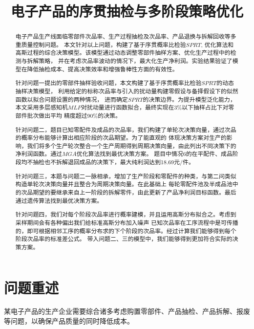 \documentclass[withoutpreface,bwprint]{cumcmthesis} %
\title{电子产品的序贯抽检与多阶段策略优化}
\begin{document}
\maketitle
\begin{abstract}
	电子产品生产线面临零部件次品率、生产过程抽检及次品率、产品退换与拆解回收等多重质量控制问题。
	本文针对以上问题，构建了基于序贯概率比检验$SPRT$,
	优化算法和高斯过程的综合决策模型。该模型通过动态调整零部件抽样方案、优化生产过程中的检测与拆解策略，
	并在考虑次品率波动的情况下，最大化生产净利润。实验结果验证了模型在降低抽检成本、提高决策效率和增强鲁棒性方面的有效性。

	针对问题一提出的零部件抽样验收问题，本文构建了基于序贯概率比检验$SPRT$的动态抽样决策模型，
	利用给定的标称次品率与引入的扰动量构建零假设与备择假设下的似然函数以拟合问题设置的两种情况，
	进而确定$SPRT$的决策边界。为提升模型泛化能力，本文采用多层感知机$MLP$对扰动量进行函数拟合，最终实现在3\%以下抽样占比下对零部件批次做出平均
	精度超过90\%的决策。

	针对问题二，题目已知零配件及成品的次品率，我们构建了单轮次决策向量，通过次品的概率分布能够计算出相应阶段的次品期望。为了能直观的
	体现决策方案对生产的影响，我们将多个生产轮次整合一个生产周期得到周期决策向量，由此列出不同决策下的净利润函数。通过$MGA$优化算法找到最优决策方案。
	题目中情况6的在平配件、成品阶段均不抽检也不拆解退回成品的决策下，最大纯利润达到18.69元/件。

	针对问题三，本题与问题二一脉相承，增加了生产阶段和零配件的种类，与第二问类似构造单轮次决策向量并且整合为周期决策向量。在此基础上
	每轮零配件池及半成品池中的次品期望的要继承来自上一阶段的拆解零件，由此更新了产品净利润目标函数。最后通过遗传算法找到最优决策方案。

	针对问题四，我们对每个阶段次品率进行概率建模，并且运用高斯分布拟合之。考虑到采样期间会有各种偏出我们给标准高斯分布加入噪声
	已知次品率在工序流程中是可传播的，即可根据相邻工序的概率分布求的下个阶段的次品率。经过计算我们能够得到每个阶段次品率的标准差公式。
	带入问题二、三的模型中，我们能够得到更加符合实际的决策方案。

\end{abstract}


\section{问题重述}
某电子产品的生产企业需要综合诸多考虑购置零部件、产品抽检、产品拆解、报废等问题，以确保产品质量的同时降低成本。
\end{document}

